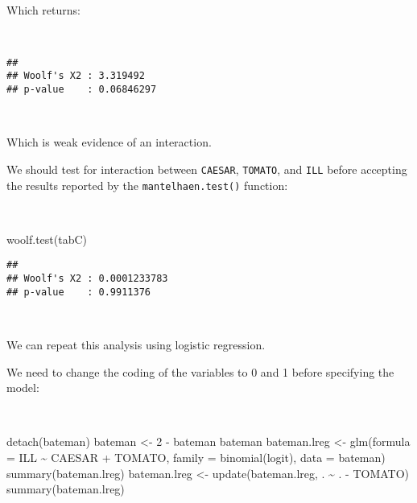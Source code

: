 \documentclass[
  12pt,
  a4paper]{book}
\newenvironment{Shaded}{\begin{snugshade}}{\end{snugshade}}
\newcommand{\AttributeTok}[1]{\textcolor[rgb]{0.77,0.63,0.00}{#1}}
\newcommand{\DecValTok}[1]{\textcolor[rgb]{0.00,0.00,0.81}{#1}}
\newcommand{\FunctionTok}[1]{\textcolor[rgb]{0.00,0.00,0.00}{#1}}
\newcommand{\NormalTok}[1]{#1}
\newcommand{\OtherTok}[1]{\textcolor[rgb]{0.56,0.35,0.01}{#1}}
\newcommand{\SpecialCharTok}[1]{\textcolor[rgb]{0.00,0.00,0.00}{#1}}
\begin{document}
~

Which returns:

~

\begin{verbatim}
## 
## Woolf's X2 : 3.319492 
## p-value    : 0.06846297
\end{verbatim}

~

Which is weak evidence of an interaction.

We should test for interaction between \texttt{CAESAR}, \texttt{TOMATO}, and \texttt{ILL} before accepting the results reported by
the \texttt{mantelhaen.test()} function:

~

\begin{Shaded}
\begin{Highlighting}[]
\FunctionTok{woolf.test}\NormalTok{(tabC)}
\end{Highlighting}
\end{Shaded}

\begin{verbatim}
## 
## Woolf's X2 : 0.0001233783 
## p-value    : 0.9911376
\end{verbatim}

~

We can repeat this analysis using logistic regression.

\newpage

We need to change the coding of the variables to 0 and 1 before specifying the model:

~

\begin{Shaded}
\begin{Highlighting}[]
\FunctionTok{detach}\NormalTok{(bateman)}
\NormalTok{bateman }\OtherTok{\textless{}{-}} \DecValTok{2} \SpecialCharTok{{-}}\NormalTok{ bateman}
\NormalTok{bateman}
\NormalTok{bateman.lreg }\OtherTok{\textless{}{-}} \FunctionTok{glm}\NormalTok{(}\AttributeTok{formula =}\NormalTok{ ILL }\SpecialCharTok{\textasciitilde{}}\NormalTok{ CAESAR }\SpecialCharTok{+}\NormalTok{ TOMATO,}
                    \AttributeTok{family =} \FunctionTok{binomial}\NormalTok{(logit), }\AttributeTok{data =}\NormalTok{ bateman)}
\FunctionTok{summary}\NormalTok{(bateman.lreg)}
\NormalTok{bateman.lreg }\OtherTok{\textless{}{-}} \FunctionTok{update}\NormalTok{(bateman.lreg, . }\SpecialCharTok{\textasciitilde{}}\NormalTok{ . }\SpecialCharTok{{-}}\NormalTok{ TOMATO)}
\FunctionTok{summary}\NormalTok{(bateman.lreg)}
\end{Highlighting}
\end{Shaded}
\end{document}
